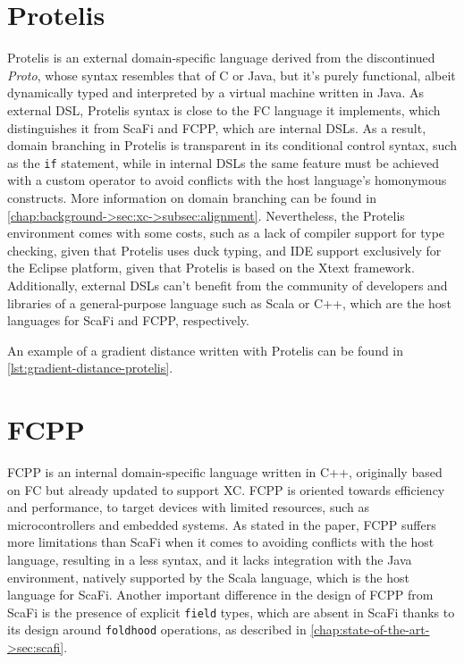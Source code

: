 \section{Protelis}

Protelis is an external domain-specific language derived from the discontinued \textit{Proto}, whose syntax resembles that of C or Java, but it's purely functional, albeit dynamically typed and interpreted by a virtual machine written in Java\cite{protelis}.
%
As external \ac{DSL}, Protelis syntax is close to the \ac{FC} language it implements, which distinguishes it from ScaFi and FCPP, which are internal \acp{DSL}.
%
As a result, domain branching in Protelis is transparent in its conditional control syntax, such as the \texttt{if} statement, while in internal \acp{DSL} the same feature must be achieved with a custom operator to avoid conflicts with the host language's homonymous constructs.
%
More information on domain branching can be found in \cref{chap:background->sec:xc->subsec:alignment}.
%
Nevertheless, the Protelis environment comes with some costs, such as a lack of compiler support for type checking, given that Protelis uses duck typing, and IDE support exclusively for the Eclipse platform, given that Protelis is based on the Xtext framework\cite{xtext}.
%
Additionally, external \acp{DSL} can't benefit from the community of developers and libraries of a general-purpose language such as Scala or C++, which are the host languages for ScaFi and FCPP, respectively.

An example of a gradient distance written with Protelis can be found in \cref{lst:gradient-distance-protelis}.




\section{FCPP}

FCPP is an internal domain-specific language written in C++, originally based on \ac{FC} but already updated to support \ac{XC}\cite{xc}.
%
FCPP is oriented towards efficiency and performance, to target devices with limited resources, such as microcontrollers and embedded systems\cite{fcpp}.
%
As stated in the paper, FCPP suffers more limitations than ScaFi when it comes to avoiding conflicts with the host language, resulting in a less  syntax, and it lacks integration with the Java environment, natively supported by the Scala language, which is the host language for ScaFi\cite{fcpp}.
%
Another important difference in the design of FCPP from ScaFi is the presence of explicit \texttt{field} types, which are absent in ScaFi thanks to its design around \texttt{foldhood} operations, as described in \cref{chap:state-of-the-art->sec:scafi}.

